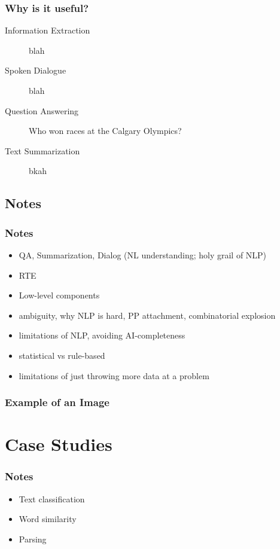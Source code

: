 \documentclass{beamer}             %
\begin{document}
\begin{frame}
  \frametitle{Why is it useful?}

  \begin{description}
    \item [Information Extraction] blah
    \item [Spoken Dialogue] blah
    \item [Question Answering] Who won races at the Calgary Olympics?
    \item [Text Summarization] bkah
  \end{description}



\end{frame}

\subsection{Notes}

\begin{frame}
  \frametitle{Notes}
  \begin{itemize}
    \item QA, Summarization, Dialog (NL understanding; holy grail of NLP)
    \item RTE
    \item Low-level components
    \item ambiguity, why NLP is hard, PP attachment, combinatorial explosion
    \item limitations of NLP, avoiding AI-completeness
    \item statistical vs rule-based
    \item limitations of just throwing more data at a problem
  \end{itemize}
\end{frame}

\begin{frame}
  \frametitle{Example of an Image}
\end{frame}


\section{Case Studies}

\begin{frame}
  \frametitle{Notes}
  \begin{itemize}
    \item Text classification
    \item Word similarity
    \item Parsing
  \end{itemize}
\end{frame}
\end{document}
